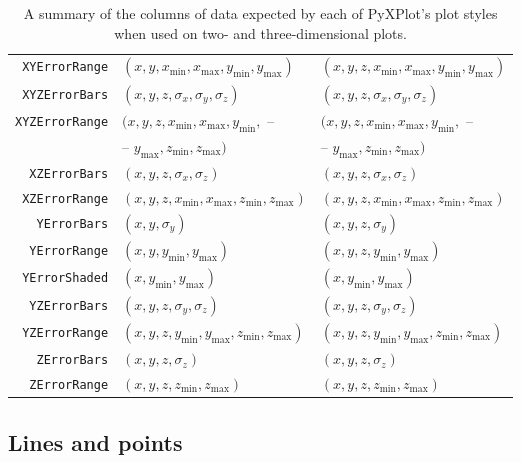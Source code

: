 \begin{table}
\begin{tabular}{|rll|}
{\tt XYErrorRange} & $(x,y,x_\mathrm{min},x_\mathrm{max},y_\mathrm{min},y_\mathrm{max})$ & $(x,y,z,x_\mathrm{min},x_\mathrm{max},y_\mathrm{min},y_\mathrm{max})$ \\
{\tt XYZErrorBars} & $(x,y,z,\sigma_x,\sigma_y,\sigma_z)$ & $(x,y,z,\sigma_x,\sigma_y,\sigma_z)$ \\
{\tt XYZErrorRange} & $(x,y,z,x_\mathrm{min},x_\mathrm{max},y_\mathrm{min},$ -- & $(x,y,z,x_\mathrm{min},x_\mathrm{max},y_\mathrm{min},$ -- \\
                    & -- $y_\mathrm{max},z_\mathrm{min},z_\mathrm{max})$ & -- $y_\mathrm{max},z_\mathrm{min},z_\mathrm{max})$ \\
{\tt XZErrorBars} & $(x,y,z,\sigma_x,\sigma_z)$ & $(x,y,z,\sigma_x,\sigma_z)$ \\
{\tt XZErrorRange} & $(x,y,z,x_\mathrm{min},x_\mathrm{max},z_\mathrm{min},z_\mathrm{max})$ & $(x,y,z,x_\mathrm{min},x_\mathrm{max},z_\mathrm{min},z_\mathrm{max})$ \\
{\tt YErrorBars} & $(x,y,\sigma_y)$ & $(x,y,z,\sigma_y)$ \\
{\tt YErrorRange} & $(x,y,y_\mathrm{min},y_\mathrm{max})$ & $(x,y,z,y_\mathrm{min},y_\mathrm{max})$ \\
{\tt YErrorShaded} & $(x,y_\mathrm{min},y_\mathrm{max})$ & $(x,y_\mathrm{min},y_\mathrm{max})$ \\
{\tt YZErrorBars} & $(x,y,z,\sigma_y,\sigma_z)$ & $(x,y,z,\sigma_y,\sigma_z)$ \\
{\tt YZErrorRange} & $(x,y,z,y_\mathrm{min},y_\mathrm{max},z_\mathrm{min},z_\mathrm{max})$ & $(x,y,z,y_\mathrm{min},y_\mathrm{max},z_\mathrm{min},z_\mathrm{max})$ \\
{\tt ZErrorBars} & $(x,y,z,\sigma_z)$ & $(x,y,z,\sigma_z)$ \\
{\tt ZErrorRange} & $(x,y,z,z_\mathrm{min},z_\mathrm{max})$ & $(x,y,z,z_\mathrm{min},z_\mathrm{max})$ \\
\hline
\end{tabular}
\caption{A summary of the columns of data expected by each of PyXPlot's plot styles when used on two- and three-dimensional plots.}
\label{tab:plot_style_columns}
\end{table}

\subsection{Lines and points}

